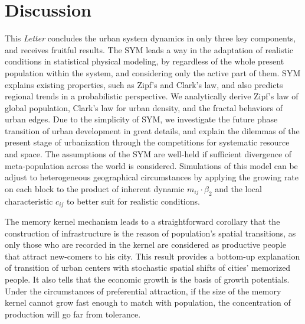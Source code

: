 \documentclass[reprint,unsortedaddress,amsmath,amssymb,aps,prl,showkeys]{revtex4-2}
\begin{document}
\section{Discussion}
This \emph{Letter} concludes the urban system dynamics in only three key components, and receives fruitful results. The SYM leads a way in the adaptation of realistic conditions in statistical physical modeling, by regardless of the whole present population within the system, and considering only the active part of them. SYM explains existing properties, such as Zipf's and Clark's law, and also predicts regional trends in a probabilistic perspective. We analytically derive 
Zipf's law of global population, Clark's law for urban density, and the fractal behaviors of urban edges. Due to the simplicity of SYM, we investigate the future phase transition of urban development in great details, and explain the dilemmas of the present stage of urbanization through the competitions for systematic resource and space. The assumptions of the SYM are well-held if sufficient divergence of meta-population across the world is considered. Simulations of this model can be adjust to heterogeneous geographical circumstances by applying the growing rate on each block to the product of inherent dynamic $m_{ij}\cdot \beta_2$ and the local characteristic $c_{ij}$ to better suit for realistic conditions.

The memory kernel mechanism leads to a straightforward corollary that the construction of infrastructure is the reason of population's spatial transitions, as only those who are recorded in the kernel are considered as productive people that attract new-comers to his city. This result provides a bottom-up explanation of transition of urban centers with stochastic spatial shifts of cities' memorized people. It also tells that the economic growth is the basis of growth potentials. Under the circumstances of preferential attraction, if the size of the memory kernel cannot grow fast enough to match with population, the concentration of production will go far from tolerance. 
\end{document}
